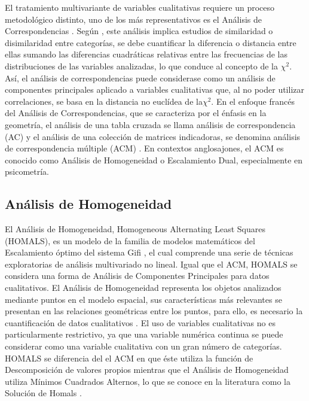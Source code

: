 \documentclass[water,article,submit,moreauthors,pdftex]{mdpi}
\begin{document}
El tratamiento multivariante de variables cualitativas requiere un
proceso metodológico distinto, uno de los más representativos es el
Análisis de Correspondencias \citep{Benzecri}. Según \citep{perez2004},
este análisis implica estudios de similaridad o disimilaridad entre
categorías, se debe cuantificar la diferencia o distancia entre ellas
sumando las diferencias cuadráticas relativas entre las frecuencias de
las distribuciones de las variables analizadas, lo que conduce al
concepto de la \(\chi^2\). Así, el análisis de correspondencias puede
considerase como un análisis de componentes principales aplicado a
variables cualitativas que, al no poder utilizar correlaciones, se basa
en la distancia no euclídea de la\(\chi^2\). En el enfoque francés del
Análisis de Correspondencias, que se caracteriza por el énfasis en la
geometría, el análisis de una tabla cruzada se llama análisis de
correspondencia (AC) y el análisis de una colección de matrices
indicadoras, se denomina análisis de correspondencia múltiple (ACM)
\citep{michailidis1998}. En contextos anglosajones, el ACM es conocido
como Análisis de Homogeneidad o Escalamiento Dual, especialmente en
psicometría.

\hypertarget{anuxe1lisis-de-homogeneidad}{%
\subsection{Análisis de
Homogeneidad}\label{anuxe1lisis-de-homogeneidad}}

El Análisis de Homogeneidad, Homogeneous Alternating Least Squares
(HOMALS), es un modelo de la familia de modelos matemáticos del
Escalamiento óptimo del sistema Gifi \citep{Gifi1990}, el cual comprende
una serie de técnicas exploratorias de análisis multivariado no lineal.
Igual que el ACM, HOMALS se considera una forma de Análisis de
Componentes Principales para datos cualitativos. El Análisis de
Homogeneidad representa los objetos analizados mediante puntos en el
modelo espacial, sus características más relevantes se presentan en las
relaciones geométricas entre los puntos, para ello, es necesario la
cuantificación de datos cualitativos \citep{Lopez2014}. El uso de
variables cualitativas no es particularmente restrictivo, ya que una
variable numérica continua se puede considerar como una variable
cualitativa con un gran número de categorías. HOMALS se diferencia del
el ACM en que éste utiliza la función de Descomposición de valores
propios mientras que el Análisis de Homogeneidad utiliza Mínimos
Cuadrados Alternos, lo que se conoce en la literatura como la Solución
de Homals \citep{michailidis1998}.
\end{document}
